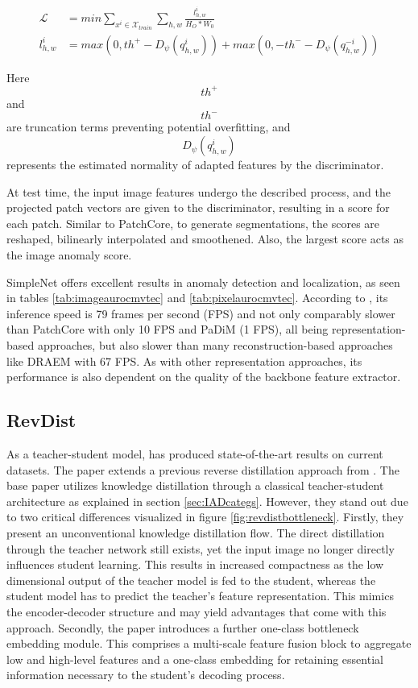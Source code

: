 \begin{equation}
 \label{eq:simplenetloss}
 \begin{split}
 \mathcal{L} &= min \sum_{x^{i}\in \mathcal{X}_{train}} \sum_{h, w} \frac{l^{i}_{h,w}}{H_{O} * W_{0}} \\
 l^{i}_{h,w} &= max(0, th^{+} - D_{\psi}(q^{i}_{h,w})) + max(0, -th^{-} - D_{\psi}(q^{-i}_{h,w}))
 \end{split}
\end{equation} 

Here $$th^{+}$$ and $$th^{-}$$ are truncation terms preventing potential overfitting, and $$D_{\psi}(q^{i}_{h,w})$$ represents the estimated normality of adapted features by the discriminator.

At test time, the input image features undergo the described process, and the projected patch vectors are given to the discriminator, resulting in a score for each patch. Similar to 
PatchCore, to generate segmentations, the scores are reshaped, bilinearly interpolated and smoothened. Also, the largest score acts as the image anomaly score.

SimpleNet offers excellent results in anomaly detection and localization, as seen in tables \ref{tab:imageaurocmvtec} and \ref{tab:pixelaurocmvtec}. According to \cite{liu2023simplenet}, its inference speed is 79 frames per second (FPS) and 
not only comparably slower than PatchCore \cite{patchCore2022} with only 10 FPS 
and PaDiM \cite{Defard_2021PADIM} (1 FPS), all being representation-based approaches, but also slower than many reconstruction-based approaches like DRAEM with 67 FPS. As with other representation 
approaches, its performance is also dependent on the quality of the backbone feature extractor.


\subsection{RevDist}
\label{subsec:revdist}

As a teacher-student model, \cite{revdist2023} has produced state-of-the-art results on current datasets. The paper extends a previous reverse distillation approach from 
\cite{Deng_2022basicrevdist}. The base paper utilizes knowledge distillation through a classical teacher-student architecture as explained in section \ref{sec:IADcategs}. However, they stand out 
due to two critical differences visualized in figure \ref{fig:revdistbottleneck}. Firstly, they present an unconventional knowledge distillation flow. The direct distillation through the teacher network still exists, 
yet the input image no longer directly influences student learning. This results in increased compactness as the low dimensional output of the teacher model is fed to the student, 
whereas the student model has to predict the teacher's feature representation. This mimics the encoder-decoder structure and may yield advantages that come with this approach. Secondly, 
the paper introduces a further one-class bottleneck embedding module. This comprises a multi-scale feature fusion block to aggregate low and high-level features and a one-class embedding 
for retaining essential information necessary to the student's decoding process. 


